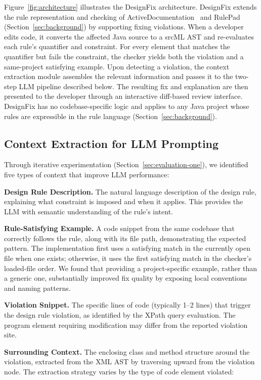 Figure~\ref{fig:architecture} illustrates the DesignFix architecture.
DesignFix extends the rule representation and checking of
ActiveDocumentation~\cite{mehrpour2019active} and
RulePad~\cite{mehrpour2020rulepad} (Section~\ref{sec:background}) by supporting fixing violations.  When a developer edits code, it converts
the affected Java source to a srcML AST and re-evaluates each rule's
quantifier and constraint. For every element that matches the quantifier
but fails the constraint, the checker yields both the violation and a
same-project satisfying example.
Upon detecting a violation, the context extraction module assembles the
relevant information and
passes it to the two-step LLM pipeline described below. The resulting
fix and explanation are then presented to the developer through an
interactive diff-based review interface. DesignFix has no codebase-specific logic and applies to any Java
project whose rules are expressible in the rule language
(Section~\ref{sec:background}).


\subsection{Context Extraction for LLM Prompting}
\label{sec:context-extraction}
Through iterative 
experimentation (Section~\ref{sec:evaluation-one}), we identified 
five types of context that improve LLM performance:

\textbf{Design Rule Description.} The natural language description of 
the design rule, explaining what constraint is imposed and when it 
applies. This provides the LLM with semantic understanding of the 
rule's intent.

\textbf{Rule-Satisfying Example.} A code snippet from the same codebase 
that correctly follows the rule, along with its file path, demonstrating 
the expected pattern. The implementation first uses a satisfying
match in the currently open file when one exists; otherwise, it uses the
first satisfying match in the checker's loaded-file order. We found that providing a project-specific example, 
rather than a generic one, substantially improved fix quality by exposing 
local conventions and naming patterns.

\textbf{Violation Snippet.} The specific lines of code (typically 1--2 
lines) that trigger the design rule violation, as identified by the 
XPath query evaluation. The program element requiring modification may differ from the reported violation site.

\textbf{Surrounding Context.} The enclosing class and method structure 
around the violation, extracted from the XML AST by traversing upward 
from the violation node. The extraction strategy varies by the type of 
code element violated:


